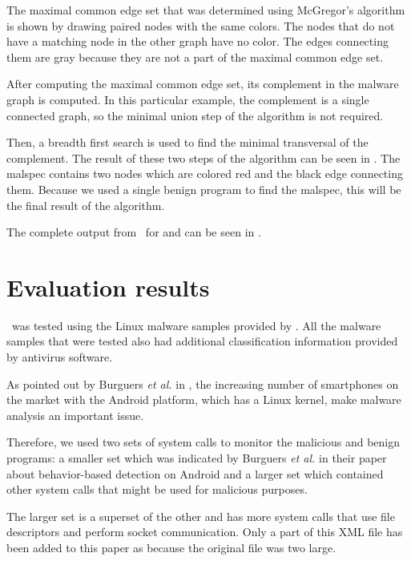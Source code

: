 The maximal common edge set that was determined using McGregor's algorithm is shown by drawing paired nodes with the same colors. The nodes that do not have a matching node in the other graph have no color. The edges connecting them are gray because they are not a part of the maximal common edge set.

After computing the maximal common edge set, its complement in the malware graph is computed. In this particular example, the complement is a single connected graph, so the minimal union step of the algorithm is not required.

Then, a breadth first search is used to find the minimal transversal of the complement. The result of these two steps of the algorithm can be seen in . The malspec contains two nodes which are colored red and the black edge connecting them. Because we used a single benign program to find the malspec, this will be the final result of the algorithm.


The complete output from \project\ for  and  can be seen in .

\section{Evaluation results}
\label{fifth:evaluation-results}

\project\ was tested using the Linux malware samples provided by \cite{open-malware}. All the malware samples that were tested also had additional classification information provided by antivirus software.

As pointed out by Burguers \textit{et al.} in \cite{crowdroid-malware-android}, the increasing number of smartphones on the market with the Android platform, which has a Linux kernel, make malware analysis an important issue.

Therefore, we used two sets of system calls to monitor the malicious and benign programs: a smaller set which was indicated by Burguers \textit{et al.} in their paper about behavior-based detection on Android \cite{crowdroid-malware-android} and a larger set which contained other system calls that might be used for malicious purposes.

The larger set is a superset of the other and has more system calls that use file descriptors and perform socket communication. Only a part of this XML file has been added to this paper as  because the original file was two large.


